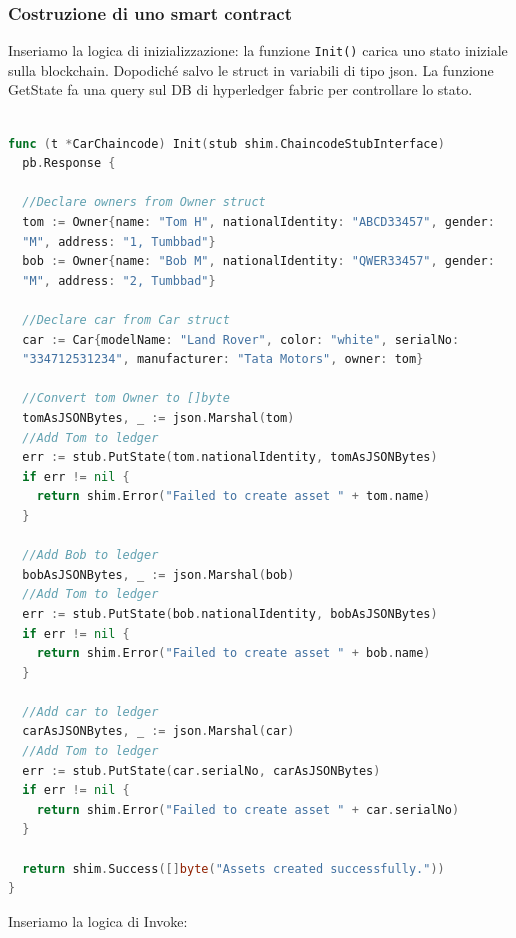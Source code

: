 \subsubsection{\textbf{Costruzione di uno smart contract}}

Inseriamo la logica di inizializzazione: la funzione \texttt{Init()} carica uno stato iniziale sulla blockchain. Dopodiché  salvo le struct in variabili di tipo json. La funzione GetState fa una query sul DB di hyperledger fabric per controllare lo stato.
\begin{lstlisting}[language=Go]

func (t *CarChaincode) Init(stub shim.ChaincodeStubInterface)
  pb.Response {
  
  //Declare owners from Owner struct
  tom := Owner{name: "Tom H", nationalIdentity: "ABCD33457", gender:
  "M", address: "1, Tumbbad"}
  bob := Owner{name: "Bob M", nationalIdentity: "QWER33457", gender:
  "M", address: "2, Tumbbad"}
  
  //Declare car from Car struct
  car := Car{modelName: "Land Rover", color: "white", serialNo:
  "334712531234", manufacturer: "Tata Motors", owner: tom}
  
  //Convert tom Owner to []byte
  tomAsJSONBytes, _ := json.Marshal(tom)
  //Add Tom to ledger
  err := stub.PutState(tom.nationalIdentity, tomAsJSONBytes)
  if err != nil {
    return shim.Error("Failed to create asset " + tom.name)
  }
  
  //Add Bob to ledger
  bobAsJSONBytes, _ := json.Marshal(bob)
  //Add Tom to ledger
  err := stub.PutState(bob.nationalIdentity, bobAsJSONBytes)
  if err != nil {
    return shim.Error("Failed to create asset " + bob.name)
  }
  
  //Add car to ledger
  carAsJSONBytes, _ := json.Marshal(car)
  //Add Tom to ledger
  err := stub.PutState(car.serialNo, carAsJSONBytes)
  if err != nil {
    return shim.Error("Failed to create asset " + car.serialNo)
  }
  
  return shim.Success([]byte("Assets created successfully."))
}

\end{lstlisting}

Inseriamo la logica di Invoke:


